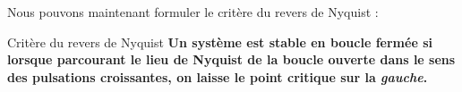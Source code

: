 Nous pouvons maintenant formuler le critère du revers de Nyquist :

\begin{criteria}{Critère du revers de Nyquist}
\textbf{Un système est stable en boucle fermée si lorsque parcourant 
        le lieu de Nyquist de la boucle ouverte dans le sens des 
        pulsations croissantes, on laisse le point critique sur la 
        \emph{gauche}.}
\end{criteria}

\newpage
